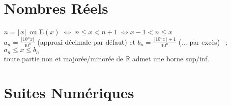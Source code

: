 \documentclass[12 pt]{book}
\begin{document}
\section*{Nombres Réels}

\begin{flushleft}
\begin{doublespace}

	$n= \lfloor x \rfloor$ ou E$(x)$ $\Leftrightarrow$ \; $n\leq x < n+1 \; \Leftrightarrow x-1 < n \leq x$\\
	$a_n = \frac{\lfloor 10^n x \rfloor}{10^n}$ (approxi décimale par défaut) et $b_n = \frac{\lfloor 10^n x \rfloor + 1}{10^n}$ (... par excès) \ ; $a_n\leq x \leq b_n$\\
	toute partie non et majorée/minorée de $\mathbb{R}$ admet une borne sup/inf.\\

\end{doublespace}
\end{flushleft}

\newpage
\section*{Suites Numériques}
\end{document}

